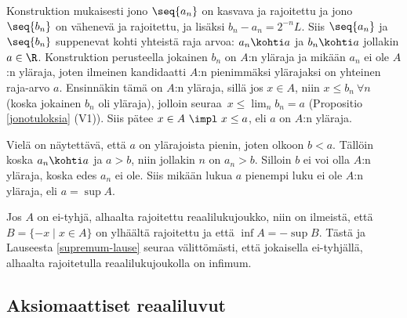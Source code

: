 Konstruktion mukaisesti jono $\seq{a_n}$ on kasvava ja rajoitettu ja jono $\seq{b_n}$ on
vähenevä ja rajoitettu, ja lisäksi $b_n-a_n=2^{-n}L$. Siis $\seq{a_n}$ ja $\seq{b_n}$
suppenevat kohti yhteistä raja arvoa: $a_n \kohti a$ ja $b_n \kohti a$ jollakin $a\in\R$.
Konstruktion perusteella jokainen $b_n$ on $A$:n yläraja ja mikään $a_n$ ei ole $A$:n yläraja,
joten ilmeinen kandidaatti $A$:n pienimmäksi ylärajaksi on yhteinen raja-arvo $a$. Ensinnäkin
tämä on $A$:n yläraja, sillä jos $x \in A$, niin $x \le b_n\ \forall n$ (koska jokainen $b_n$ 
oli yläraja), jolloin seuraa $\,x \le \lim_n b_n=a$ (Propositio \ref{jonotuloksia} (V1)).
Siis pätee $x \in A\ \impl\ x \le a$, eli $a$ on $A$:n yläraja.

Vielä on näytettävä, että $a$ on ylärajoista pienin, joten olkoon $b<a$. Tällöin koska 
$a_n \kohti a$ ja $a>b$, niin jollakin $n$ on $a_n>b$. Silloin $b$ ei voi olla $A$:n yläraja, 
koska edes $a_n$ ei ole. Siis mikään lukua $a$ pienempi luku ei ole $A$:n yläraja, eli 
$a=\sup A$. \loppu

Jos $A$ on ei-tyhjä, alhaalta rajoitettu reaalilukujoukko, niin on ilmeistä, että 
$B = \{-x \mid x \in A\}$ on ylhäältä rajoitettu ja että $\inf A = - \sup B$. Tästä ja 
Lauseesta \ref{supremum-lause} seuraa välittömästi, että jokaisella ei-tyhjällä, alhaalta 
rajoitetulla reaalilukujoukolla on infimum.

\subsection*{Aksiomaattiset reaaliluvut}

